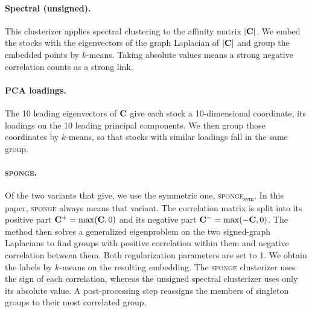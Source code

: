 \paragraph{Spectral (unsigned).} This clusterizer applies spectral clustering to the affinity matrix
$|\mathbf{C}|$. We embed the stocks with the eigenvectors of the graph Laplacian of $|\mathbf{C}|$
and group the embedded points by $k$-means. Taking absolute
values means a strong negative correlation counts as a strong link.

\paragraph{PCA loadings.} The 10 leading eigenvectors of $\mathbf{C}$
give each stock a 10-dimensional coordinate, its loadings on the 10 leading
principal components. We then group those coordinates by $k$-means, so that stocks with similar loadings fall in the same group.

\paragraph{\textsc{sponge}.} Of the two variants that \citet{cucuringu2019sponge} give,
we use the symmetric one, \textsc{sponge}$_{\mathrm{sym}}$.
In this paper, \textsc{sponge} always means that variant. The
correlation matrix is split into its positive part
$\mathbf{C}^{+} = \max(\mathbf{C}, 0)$ and its negative part
$\mathbf{C}^{-} = \max(-\mathbf{C}, 0)$. The method then
solves a generalized eigenproblem on the two signed-graph Laplacians to find groups with
positive correlation within them and negative correlation between them. Both regularization parameters are set to $1$.
We obtain the labels by $k$-means on the resulting embedding. The \textsc{sponge} clusterizer uses the sign of each correlation, whereas the unsigned spectral clusterizer uses only its absolute value. A
post-processing step reassigns the members of singleton groups to
their most correlated group.

